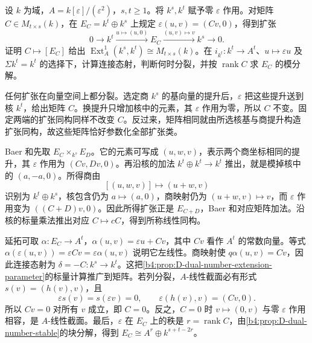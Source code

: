 \begin{exercise}\label{b4:ex:D-extension-parameter-connecting}
	设 \(k\) 为域，\(A=k[\varepsilon]/(\varepsilon^2)\)，\(s,t\ge1\)。将 \(k^s,k^t\) 赋予零 \(\varepsilon\) 作用。对矩阵 \(C\in M_{t\times s}(k)\)，在 \(E_C=k^t\oplus k^s\) 上规定 \(\varepsilon(u,v)=(Cv,0)\)，得到扩张
	\[
		0\longrightarrow k^t\xrightarrow{u\mapsto(u,0)}E_C \xrightarrow{(u,v)\mapsto v}k^s\longrightarrow0.
	\]
	证明 \(C\mapsto[E_C]\) 给出 \(\operatorname{Ext}_A^1(k^s,k^t)\cong M_{t\times s}(k)\)。在 \(i_{k^t}:k^t\to A^t\)、\(u\mapsto\varepsilon u\) 及 \(\Sigma k^t=k^t\) 的选择下，计算连接态射，判断何时分裂，并按 \(\operatorname{rank}C\) 求 \(E_C\) 的模分解。
\end{exercise}
\begin{solution}
	任何扩张在向量空间上都分裂。选定商 \(k^s\) 的基向量的提升后，\(\varepsilon\) 把这些提升送到核 \(k^t\)，给出矩阵 \(C\)。换提升只增加核中的元素，其 \(\varepsilon\) 作用为零，所以 \(C\) 不变。固定两端的扩张同构同样不改变 \(C\)。反过来，矩阵相同就由所选核基与商提升构造扩张同构，故这些矩阵恰好参数化全部扩张类。

	Baer 和先取 \(E_C\times_{k^s}E_D\)。它的元素可写成 \((u,w,v)\)，表示两个商坐标相同的提升，其 \(\varepsilon\) 作用为 \((Cv,Dv,0)\)。再沿核的加法 \(k^t\oplus k^t\to k^t\) 推出，就是模掉核中的 \((a,-a,0)\)。所得商由
	\[
		[(u,w,v)]\longmapsto(u+w,v)
	\]
	识别为 \(k^t\oplus k^s\)，核包含仍为 \(a\mapsto(a,0)\)，商映射仍为 \((u+w,v)\mapsto v\)，而 \(\varepsilon\) 作用变为 \(((C+D)v,0)\)。因此所得扩张正是 \(E_{C+D}\)，Baer 和对应矩阵加法。沿核的标量乘法推出对应 \(C\mapsto cC\)，得到所称线性同构。

	延拓可取 \(\alpha:E_C\to A^t\)，\(\alpha(u,v)=\varepsilon u+Cv\)，其中 \(Cv\) 看作 \(A^t\) 的常数向量。等式 \(\alpha(\varepsilon(u,v))=\varepsilon Cv=\varepsilon\alpha(u,v)\) 说明它左线性。商映射使 \(q\alpha(u,v)=Cv\)，因此连接态射为 \(\delta=-C:k^s\to k^t\)。这把\cref{b4:prop:D-dual-number-extension-parameter}的标量计算推广到矩阵。若列分裂，\(A\)-线性截面必有形式 \(s(v)=(h(v),v)\)，且
	\[
		\varepsilon s(v)=s(\varepsilon v)=0,\qquad \varepsilon(h(v),v)=(Cv,0).
	\]
	所以 \(Cv=0\) 对所有 \(v\) 成立，即 \(C=0\)。反之，\(C=0\) 时 \(v\mapsto(0,v)\) 与零 \(\varepsilon\) 作用相容，是 \(A\)-线性截面。最后，\(\varepsilon\) 在 \(E_C\) 上的秩是 \(r=\operatorname{rank}C\)，由\cref{b4:prop:D-dual-number-stable}的块分解，得到 \(E_C\cong A^r\oplus k^{s+t-2r}\)。
\end{solution}
